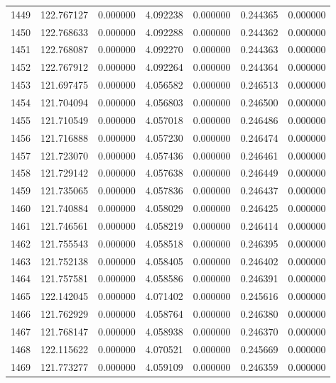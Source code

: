 \begin{tabular}{rrrrrrr}
1449 & 122.767127 &    0.000000 &  4.092238 &   0.000000 &   0.244365 &  0.000000 \\
1450 & 122.768633 &    0.000000 &  4.092288 &   0.000000 &   0.244362 &  0.000000 \\
1451 & 122.768087 &    0.000000 &  4.092270 &   0.000000 &   0.244363 &  0.000000 \\
1452 & 122.767912 &    0.000000 &  4.092264 &   0.000000 &   0.244364 &  0.000000 \\
1453 & 121.697475 &    0.000000 &  4.056582 &   0.000000 &   0.246513 &  0.000000 \\
1454 & 121.704094 &    0.000000 &  4.056803 &   0.000000 &   0.246500 &  0.000000 \\
1455 & 121.710549 &    0.000000 &  4.057018 &   0.000000 &   0.246486 &  0.000000 \\
1456 & 121.716888 &    0.000000 &  4.057230 &   0.000000 &   0.246474 &  0.000000 \\
1457 & 121.723070 &    0.000000 &  4.057436 &   0.000000 &   0.246461 &  0.000000 \\
1458 & 121.729142 &    0.000000 &  4.057638 &   0.000000 &   0.246449 &  0.000000 \\
1459 & 121.735065 &    0.000000 &  4.057836 &   0.000000 &   0.246437 &  0.000000 \\
1460 & 121.740884 &    0.000000 &  4.058029 &   0.000000 &   0.246425 &  0.000000 \\
1461 & 121.746561 &    0.000000 &  4.058219 &   0.000000 &   0.246414 &  0.000000 \\
1462 & 121.755543 &    0.000000 &  4.058518 &   0.000000 &   0.246395 &  0.000000 \\
1463 & 121.752138 &    0.000000 &  4.058405 &   0.000000 &   0.246402 &  0.000000 \\
1464 & 121.757581 &    0.000000 &  4.058586 &   0.000000 &   0.246391 &  0.000000 \\
1465 & 122.142045 &    0.000000 &  4.071402 &   0.000000 &   0.245616 &  0.000000 \\
1466 & 121.762929 &    0.000000 &  4.058764 &   0.000000 &   0.246380 &  0.000000 \\
1467 & 121.768147 &    0.000000 &  4.058938 &   0.000000 &   0.246370 &  0.000000 \\
1468 & 122.115622 &    0.000000 &  4.070521 &   0.000000 &   0.245669 &  0.000000 \\
1469 & 121.773277 &    0.000000 &  4.059109 &   0.000000 &   0.246359 &  0.000000 \\

\end{tabular}

